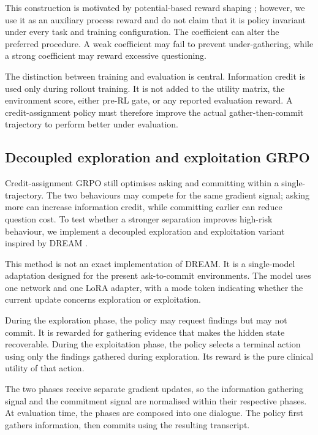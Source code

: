 \documentclass{article}
\begin{document}
This construction is motivated by potential-based reward shaping
\citep{ng1999shaping}; however, we use it as an auxiliary process reward and do not
claim that it is policy invariant under every task and training configuration.
The coefficient can alter the preferred procedure. A weak coefficient may fail to
prevent under-gathering, while a strong coefficient may reward excessive
questioning.

The distinction between training and evaluation is central. Information credit is
used only during rollout training. It is not added to the utility matrix, the
environment score, either pre-RL gate, or any reported evaluation reward. A credit-assignment policy must therefore improve the actual gather-then-commit trajectory
to perform better under evaluation.

\subsection{Decoupled exploration and exploitation GRPO}
\label{subsec:decoupled}

Credit-assignment GRPO still optimises asking and committing within a single-trajectory. The two behaviours may compete for the same gradient signal; asking
more can increase information credit, while committing earlier can reduce question
cost. To test whether a stronger separation improves high-risk behaviour, we
implement a decoupled exploration and exploitation variant inspired by DREAM
\citep{liu2021dream}.

This method is not an exact implementation of DREAM. It is a single-model adaptation designed for the present ask-to-commit environments. The model uses one
network and one LoRA adapter, with a mode token indicating whether the current
update concerns exploration or exploitation.

During the exploration phase, the policy may request findings but may not commit.
It is rewarded for gathering evidence that makes the hidden state recoverable.
During the exploitation phase, the policy selects a terminal action using only the
findings gathered during exploration. Its reward is the pure clinical utility of
that action.

The two phases receive separate gradient updates, so the information gathering
signal and the commitment signal are normalised within their respective phases.
At evaluation time, the phases are composed into one dialogue. The policy first
gathers information, then commits using the resulting transcript.
\end{document}

